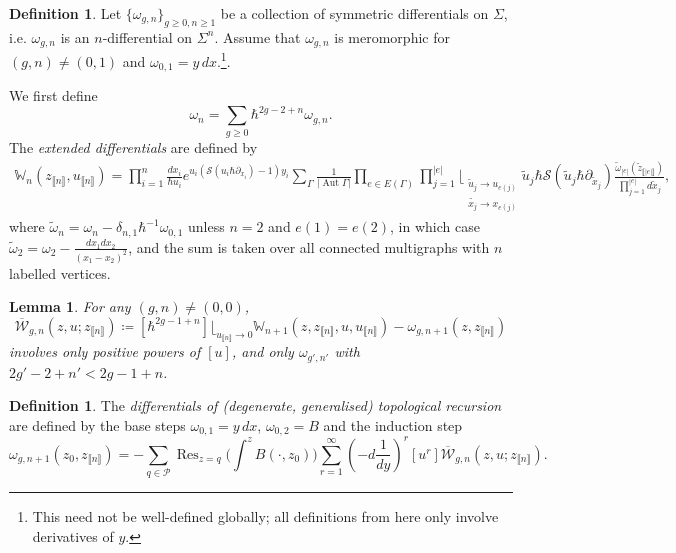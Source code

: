 \documentclass[10pt,a4paper,oneside,no-math,reqno]{amsart}%
\theoremstyle{plain}
\newtheorem{lemma}[theorem]{Lemma}
\theoremstyle{definition}
\newtheorem{definition}[theorem]{Definition}
\theoremstyle{remark}
\numberwithin{equation}{section}
\newcommand{\mb}[1]{\mathbb{#1}}
\newcommand{\mc}[1]{\mathcal{#1}}
\newcommand{\1}{\mathds{1}}
\newcommand{\<}{\langle}
\renewcommand{\>}{\rangle}
\newcommand{\del}{\partial}
\DeclareMathOperator{\Aut}{Aut}
\DeclareMathOperator*{\Res}{Res}
\begin{document}
\begin{definition}\label{DefExtendedDifferentials}
    Let $ \{ \omega_{g,n} \}_{g \geq 0, n \geq 1} $ be a collection of symmetric differentials on $ \Sigma$, i.e. $ \omega_{g,n} $ is an $n$-differential on $ \Sigma^n$. Assume that $ \omega_{g,n} $ is meromorphic for $ (g,n) \neq (0,1)$ and $ \omega_{0,1} = y \,dx$.\footnote{This need not be well-defined globally; all definitions from here only involve derivatives of $ y$.}.\par
    We first define
    \begin{equation}
        \omega_n
        =
        \sum_{g \geq 0} \hbar^{2g-2+n} \omega_{g,n}.
    \end{equation}
    The \emph{extended differentials} are defined by
    \begin{align}
        \mb{W}_n (z_{\llbracket n \rrbracket}, u_{\llbracket n \rrbracket})
        =
        \prod_{i=1}^n \frac{dx_i}{\hbar u_i} e^{u_i ( \mc{S} (u_i \hbar \del_{x_i}) - 1) y_i} 
        \sum_\Gamma \frac{1}{| \Aut \Gamma |} \prod_{e \in E (\Gamma )} \prod_{j=1}^{|e|} \Big\lfloor_{\substack{\tilde{u}_j \to u_{e(j)} \\ \tilde{x_j} \to x_{e(j)}}} \tilde{u}_j \hbar \mc{S} ( \tilde{u}_j \hbar \del_{\tilde{x}_j} ) \frac{ \tilde{\omega}_{|e|}(\tilde{z}_{\llbracket|e|\rrbracket}) }{\prod_{j=1}^{|e|} d\tilde{x}_j},
    \end{align}
    where $ \tilde{\omega}_n = \omega_n - \delta_{n,1} \hbar^{-1} \omega_{0,1}$ unless $ n =2 $ and $ e(1) = e(2)$, in which case $ \tilde{\omega}_2 = \omega_2 - \frac{dx_1 dx_2}{(x_1 - x_2)^2}$, and the sum is taken over all connected multigraphs with $ n $ labelled vertices.
\end{definition}

\begin{lemma}\label{DegenerateLoopEquations}
    For any $ (g,n) \neq (0,0)$,
    \begin{equation}
        \overline{\mc{W}}_{g,n} (z, u; z_{\llbracket n \rrbracket} )
        \coloneqq
        [\hbar^{2g-1+n}] \bigg\lfloor_{u_{\llbracket n \rrbracket} \to 0} \mb{W}_{n+1} ( z, z_{\llbracket n \rrbracket}, u, u_{\llbracket n \rrbracket}) - \omega_{g,n+1}(z, z_{\llbracket n \rrbracket})
    \end{equation}
    involves only positive powers of $ [u]$, and only $ \omega_{g',n'}$ with $ 2g' - 2 + n' < 2g-1+n$.
\end{lemma}

\begin{definition}\label{DegenerateTR}
    The \emph{differentials of (degenerate, generalised) topological recursion} are defined by the base steps $ \omega_{0,1} = y \, dx$, $ \omega_{0,2} = B$ and the induction step
    \begin{equation}
        \omega_{g,n+1}(z_0, z_{\llbracket n \rrbracket})
        =
        - \sum_{q \in \mc{P}} \Res_{z = q} 
        \Big( \int^z B( \cdot, z_0) \Big)
        \sum_{r = 1}^\infty ( - d \frac{1}{dy} )^r [u^r] \overline{\mc{W}}_{g,n} (z, u; z_{\llbracket n \rrbracket}).
    \end{equation}
\end{definition}
\end{document}
